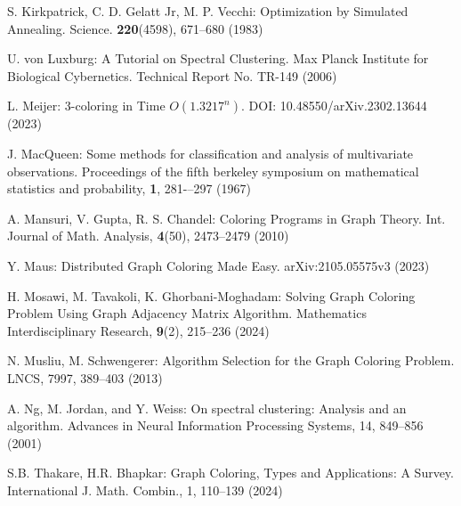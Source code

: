 \documentclass[runningheads]{llncs}
\begin{document}
\begin{thebibliography}{8}
  S. Kirkpatrick, C. D. Gelatt Jr, M. P. Vecchi: Optimization by Simulated Annealing. Science. \textbf{220}(4598), 671--680 (1983)

 U. von Luxburg: A Tutorial on Spectral Clustering. Max Planck Institute for Biological Cybernetics. Technical Report No. TR-149 (2006)

 L. Meijer: 3-coloring in Time $O(1.3217^{n})$. DOI: 10.48550/arXiv.2302.13644 (2023)

 J. MacQueen: Some methods for classification and analysis of multivariate observations. Proceedings of the fifth berkeley symposium on mathematical statistics and probability, \textbf{1}, 281-–297 (1967)

 A. Mansuri, V. Gupta, R. S. Chandel: Coloring Programs in Graph Theory. Int. Journal of Math. Analysis, \textbf{4}(50), 2473--2479 (2010)

 Y. Maus: Distributed Graph Coloring Made Easy. arXiv:2105.05575v3 (2023)

 H. Mosawi, M. Tavakoli, K. Ghorbani-Moghadam: Solving Graph Coloring Problem Using Graph Adjacency Matrix Algorithm. Mathematics Interdisciplinary Research, \textbf{9}(2), 215--236 (2024)

 N. Musliu, M. Schwengerer: Algorithm Selection for the Graph Coloring Problem. LNCS, 7997, 389--403 (2013)

 A. Ng, M. Jordan, and Y. Weiss: On spectral clustering: Analysis and an algorithm. Advances in Neural Information Processing Systems, 14, 849--856 (2001)

 S.B. Thakare, H.R. Bhapkar: Graph Coloring, Types and Applications: A Survey. International J. Math. Combin., 1, 110--139 (2024)

\end{thebibliography}
\end{document}
